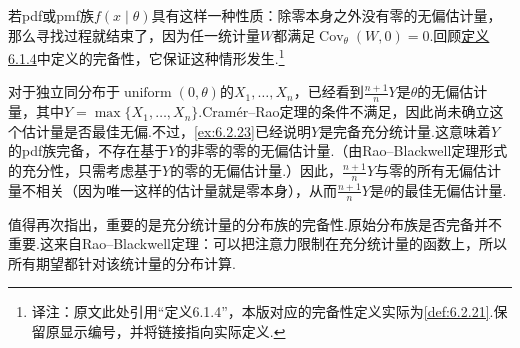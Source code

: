 若pdf或pmf族$f(x\mid\theta)$具有这样一种性质：除零本身之外没有零的无偏估计量，那么寻找过程就结束了，因为任一统计量$W$都满足$\operatorname{Cov}_\theta(W,0)=0$.回顾\hyperref[def:6.2.21]{定义6.1.4}中定义的完备性，它保证这种情形发生.\footnote{译注：原文此处引用“定义6.1.4”，本版对应的完备性定义实际为\autoref{def:6.2.21}.保留原显示编号，并将链接指向实际定义.}
\begin{example}[续\autoref{ex:7.3.13}]\label{ex:7.3.22}
对于独立同分布于$\operatorname{uniform}(0,\theta)$的$X_1,\ldots,X_n$，已经看到$\frac{n+1}nY$是$\theta$的无偏估计量，其中$Y=\max\{X_1,\ldots,X_n\}$.Cramér--Rao定理的条件不满足，因此尚未确立这个估计量是否最佳无偏.不过，\autoref{ex:6.2.23}已经说明$Y$是完备充分统计量.这意味着$Y$的pdf族完备，不存在基于$Y$的非零的零的无偏估计量.（由Rao--Blackwell定理形式的充分性，只需考虑基于$Y$的零的无偏估计量.）因此，$\frac{n+1}nY$与零的所有无偏估计量不相关（因为唯一这样的估计量就是零本身），从而$\frac{n+1}nY$是$\theta$的最佳无偏估计量.
\end{example}
值得再次指出，重要的是充分统计量的分布族的完备性.原始分布族是否完备并不重要.这来自Rao--Blackwell定理：可以把注意力限制在充分统计量的函数上，所以所有期望都针对该统计量的分布计算.

